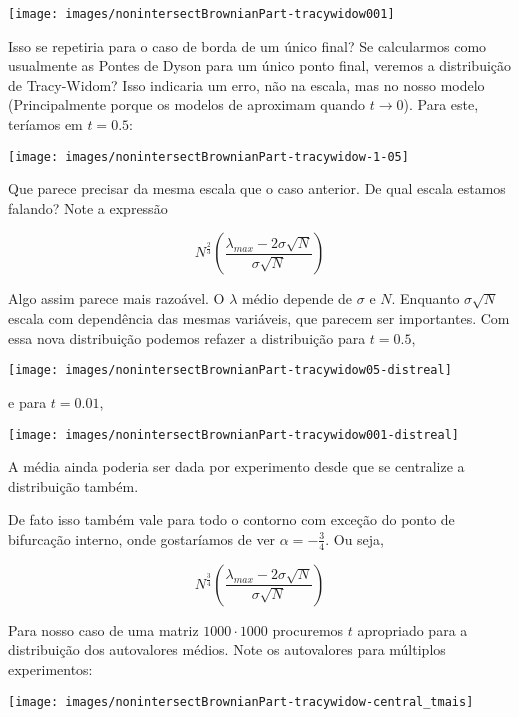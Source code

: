 \begin{center} 	\texttt{[image: images/nonintersectBrownianPart-tracywidow001]}
\end{center}

Isso se repetiria para o caso de borda de um único final? Se calcularmos como usualmente as Pontes de Dyson para um único ponto final, veremos a distribuição de Tracy-Widom? Isso indicaria um erro, não na escala, mas no nosso modelo (Principalmente porque os modelos de aproximam quando $t \rightarrow 0$). Para este, teríamos em $t=0.5$:

\begin{center} 	\texttt{[image: images/nonintersectBrownianPart-tracywidow-1-05]}
\end{center}

Que parece precisar da mesma escala que o caso anterior. De qual escala estamos falando? Note a expressão

\[
	N^{\frac{2}{3}} \left( \frac{\lambda_{max} - 2\sigma\sqrt{N}}{\sigma \sqrt{N}}  \right) 
\]

Algo assim parece mais razoável. O $\lambda$ médio depende de $\sigma$ e $N$. Enquanto $\sigma \sqrt{N}$ escala com dependência das mesmas variáveis, que parecem ser importantes. Com essa nova distribuição podemos refazer a distribuição para $t=0.5$,

\begin{center} 	\texttt{[image: images/nonintersectBrownianPart-tracywidow05-distreal]}
\end{center}

e para $t=0.01$,

\begin{center} 	\texttt{[image: images/nonintersectBrownianPart-tracywidow001-distreal]}
\end{center}

A média ainda poderia ser dada por experimento desde que se centralize a distribuição também.

De fato isso também vale para todo o contorno com exceção do ponto de bifurcação interno, onde gostaríamos de ver $\alpha=-\frac{3}{4}$. Ou seja,

\[
N^{\frac{3}{4}} \left( \frac{\lambda_{max} - 2\sigma\sqrt{N}}{\sigma \sqrt{N}}  \right) 
\]

Para nosso caso de uma matriz $1000\cdot 1000$ procuremos $t$ apropriado para a distribuição dos autovalores médios. Note os autovalores para múltiplos experimentos:


\begin{center} 	\texttt{[image: images/nonintersectBrownianPart-tracywidow-central\_tmais]}
\end{center}


